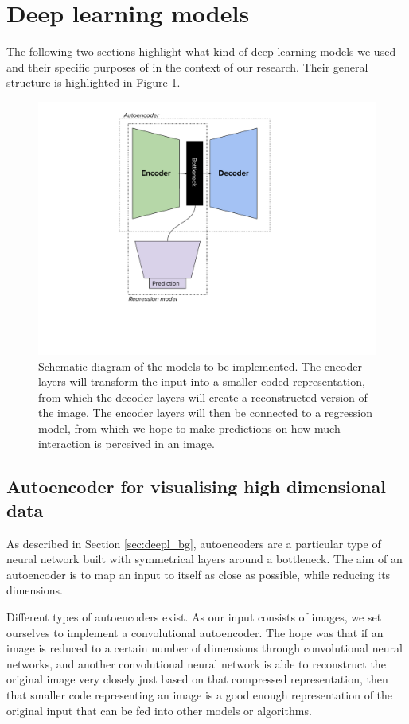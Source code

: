 \section{Deep learning models}

The following two sections highlight what kind of deep learning models we used and their specific purposes of in the context of our research. Their general structure is highlighted in Figure \ref{fig:connected_models}.

\begin{figure}[h]
    \centering
    \includegraphics[width=.5\textwidth]{dissertation/figures/autoencoder_regression_connection.pdf}
    \caption{Schematic diagram of the models to be implemented. The encoder layers will transform the input into a smaller coded representation, from which the decoder layers will create a reconstructed version of the image. The encoder layers will then be connected to a regression model, from which we hope to make predictions on how much interaction is perceived in an image.}
    \label{fig:connected_models}
\end{figure}

\subsection{Autoencoder for visualising high dimensional data}

As described in Section \ref{sec:deepl_bg}, autoencoders are a particular type of neural network built with symmetrical layers around a bottleneck. The aim of an autoencoder is to map an input to itself as close as possible, while reducing its dimensions.

Different types of autoencoders exist. As our input consists of images, we set ourselves to implement a convolutional autoencoder. The hope was that if an image is reduced to a certain number of dimensions through convolutional neural networks, and another convolutional neural network is able to reconstruct the original image very closely just based on that compressed representation, then that smaller code representing an image is a good enough representation of the original input that can be fed into other models or algorithms.

